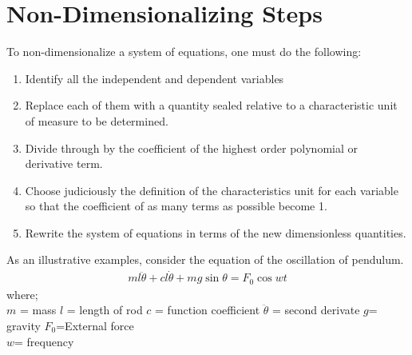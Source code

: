 \documentclass[11pt]{report}
\begin{document}
	\section{Non-Dimensionalizing Steps}
	To non-dimensionalize a system of equations, one must do the following:
	\begin{enumerate}
		\item Identify all the independent and dependent variables
		\item Replace each of them with a quantity sealed relative to a characteristic unit of measure to be determined.
		\item Divide through by the coefficient of the highest order polynomial or derivative term.
		\item Choose judiciously the definition of the characteristics unit for each variable so that the coefficient of as many terms as possible become 1.
		\item Rewrite the system of equations in terms of the new dimensionless quantities.
	\end{enumerate}
	As an illustrative examples, consider the equation of the oscillation of pendulum.
	\begin{eqnarray*}
		ml\ddot{\theta} + cl\dot{\theta} + mg\sin\theta = F_0\cos wt
	\end{eqnarray*}
	where;\\
	\hspace*{0.4cm} $m$ = mass \qquad \hspace*{0.4cm} $l$ = length of rod \qquad \hspace*{0.4cm} $c$ = function coefficient \qquad \hspace*{0.4cm} $\ddot{\theta}$ = second derivate\qquad\hspace*{0.4cm} $g$= gravity \qquad\hspace*{0.4cm} $F_0$=External force\\
	\hspace*{0.4cm} $w$= frequency\\
	
\end{document}
